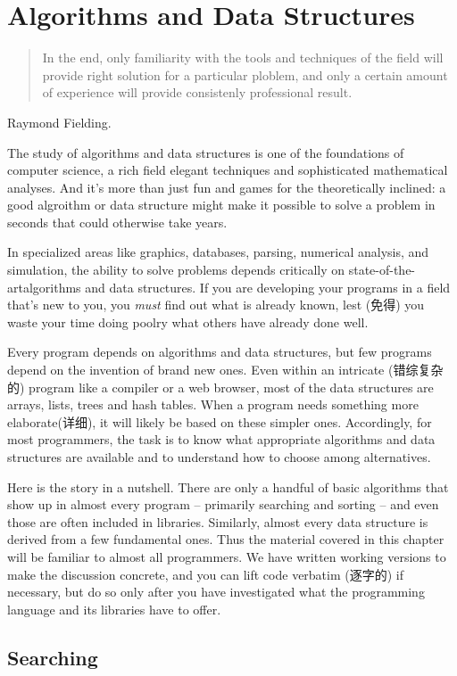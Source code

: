 \chapter{Algorithms and Data Structures}
\label{chap:alds}
\begin{quote}
    In the end, only familiarity with the tools and techniques of the field
    will provide right solution for a particular ploblem, and only a
    certain amount of experience will provide consistenly professional
    result.
\end{quote}
\begin{quotesrc}
    Raymond Fielding.
\end{quotesrc}
The study of algorithms and data structures is one of the foundations of
computer science, a rich field elegant techniques and sophisticated
mathematical analyses. And it's more than just fun and games for the
theoretically inclined: a good algroithm or data structure might make it
possible to solve a problem in seconds that could otherwise take years.

In specialized areas like graphics, databases, parsing, numerical analysis,
and simulation, the ability to solve problems depends critically on
state-of-the-artalgorithms and data structures. If you are developing your
programs in a field that's new to you, you \textit{must} find out what is
already known, lest (免得) you waste your time doing poolry what others have
already done well.

Every program depends on algorithms and data structures, but few programs
depend on the invention of brand new ones. Even within an intricate
(错综复杂的) program like a compiler or a web browser, most of the data
structures are arrays, lists, trees and hash tables. When a program needs
something more elaborate(详细), it will likely be based on these simpler
ones. Accordingly, for most programmers, the task is to know what
appropriate algorithms and data structures are available and to understand
how to choose among alternatives.

Here is the story in a nutshell. There are only a handful of basic
algorithms that show up in almost every program -- primarily searching and
sorting -- and even those are often included in libraries. Similarly,
almost every data structure is derived from a few fundamental ones. Thus
the material covered in this chapter will be familiar to almost all
programmers. We have written working versions to make the discussion
concrete, and you can lift code verbatim (逐字的) if necessary, but do so
only after you have investigated what the programming language and its
libraries have to offer.

\section{Searching}
